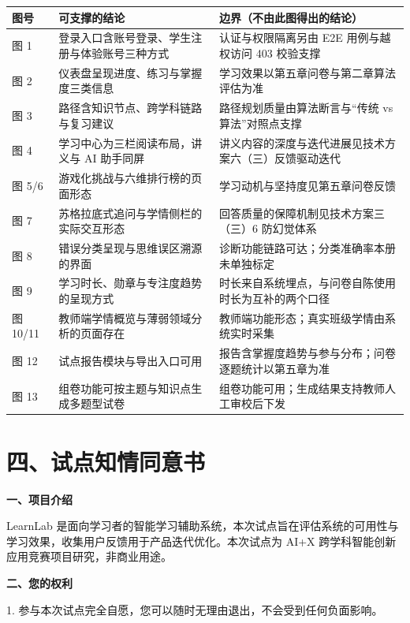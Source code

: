 \documentclass[zihao=-4,a4paper,UTF8,fontset=windows]{ctexart}
\begin{document}
\par\noindent\begin{tabular}{|p{1.6cm}|p{4.8cm}|p{6.6cm}|}
\hline
\textbf{图号} & \textbf{可支撑的结论} & \textbf{边界（不由此图得出的结论）} \\ \hline
图 1 & 登录入口含账号登录、学生注册与体验账号三种方式 & 认证与权限隔离另由 E2E 用例与越权访问 403 校验支撑 \\ \hline
图 2 & 仪表盘呈现进度、练习与掌握度三类信息 & 学习效果以第五章问卷与第二章算法评估为准 \\ \hline
图 3 & 路径含知识节点、跨学科链路与复习建议 & 路径规划质量由算法断言与“传统 vs 算法”对照点支撑 \\ \hline
图 4 & 学习中心为三栏阅读布局，讲义与 AI 助手同屏 & 讲义内容的深度与迭代进展见技术方案六（三）反馈驱动迭代 \\ \hline
图 5/6 & 游戏化挑战与六维排行榜的页面形态 & 学习动机与坚持度见第五章问卷反馈 \\ \hline
图 7 & 苏格拉底式追问与学情侧栏的实际交互形态 & 回答质量的保障机制见技术方案三（三）6 防幻觉体系 \\ \hline
图 8 & 错误分类呈现与思维误区溯源的界面 & 诊断功能链路可达；分类准确率本册未单独标定 \\ \hline
图 9 & 学习时长、勋章与专注度趋势的呈现方式 & 时长来自系统埋点，与问卷自陈使用时长为互补的两个口径 \\ \hline
图 10/11 & 教师端学情概览与薄弱领域分析的页面存在 & 教师端功能形态；真实班级学情由系统实时采集 \\ \hline
图 12 & 试点报告模块与导出入口可用 & 报告含掌握度趋势与参与分布；问卷逐题统计以第五章为准 \\ \hline
图 13 & 组卷功能可按主题与知识点生成多题型试卷 & 组卷功能可用；生成结果支持教师人工审校后下发 \\ \hline
\end{tabular}\par

\section{四、试点知情同意书}

\textbf{一、项目介绍}

LearnLab 是面向学习者的智能学习辅助系统，本次试点旨在评估系统的可用性与学习效果，收集用户反馈用于产品迭代优化。本次试点为 AI+X 跨学科智能创新应用竞赛项目研究，非商业用途。

\textbf{二、您的权利}

1. 参与本次试点完全自愿，您可以随时无理由退出，不会受到任何负面影响。
\end{document}
